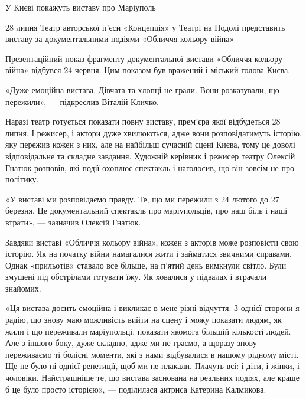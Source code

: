  
 
 
 
 

У Києві покажуть виставу про Маріуполь

28 липня Театр авторської п'єси «Концепція» у Театрі на Подолі представить
виставу за документальними подіями «Обличчя кольору війна»

Презентаційний показ фрагменту документальної вистави «Обличчя кольору війна»
відбувся 24 червня. Цим показом був вражений і міський голова Києва.

«Дуже емоційна вистава. Дівчата та хлопці не грали. Вони розказували, що
пережили», — підкреслив Віталій Кличко.

Наразі театр готується показати повну виставу, прем'єра якої відбудеться 28
липня. І режисер, і актори дуже хвилюються, адже вони розповідатимуть історію,
яку пережив кожен з них, але на найбільш сучасній сцені Києва, тому це доволі
відповідальне та складне завдання. Художній керівник і режисер театру Олексій
Гнатюк розповів, які події охоплює спектакль і наголосив, що він зовсім не про
політику.

«У виставі ми розповідаємо правду. Те, що ми пережили з 24 лютого до 27
березня. Це документальний спектакль про маріупольців, про наш біль і наші
втрати», — зазначив Олексій Гнатюк. 

Завдяки виставі «Обличчя кольору війна», кожен з акторів може розповісти свою
історію. Як на початку війни намагалися жити і займатися звичними справами.
Однак «прильотів» ставало все більше, на п'ятий день вимкнули світло. Були
змушені під обстрілами готувати їжу. Як ховалися у підвалах і втрачали
знайомих.

«Ця вистава досить емоційна і викликає в мене різні відчуття. З однієї сторони
я радію, що знову маю можливість вийти на сцену і можу показати людям, як жили
і що переживали маріупольці, показати якомога більшій кількості людей. Але з
іншого боку, дуже складно, адже ми не граємо, а щоразу знову переживаємо ті
болісні моменти, які з нами відбувалися в нашому рідному місті. Ще не було ні
однієї репетиції, щоб ми не плакали. Плачуть всі: і діти, і жінки, і чоловіки.
Найстрашніше те, що вистава заснована на реальних подіях, але краще б це було
просто історією», — поділилася актриса Катерина Калмикова. 

